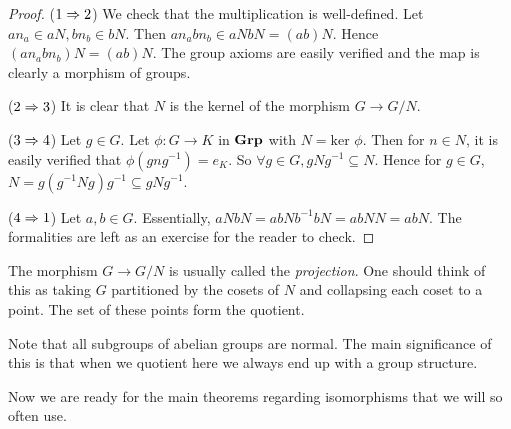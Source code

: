 \documentclass[../book.tex]{subfiles}
\begin{document}
\begin{proof}
    ($1 \Rightarrow 2$) 
        We check that the multiplication is well-defined. 
        Let $an_a \in aN, bn_b \in bN$. 
        Then $an_abn_b \in aNbN = (ab)N$. 
        Hence $(an_abn_b)N = (ab)N$.
        The group axioms are easily verified
        and the map is clearly a morphism of groups.
        
    ($2 \Rightarrow 3$)
        It is clear that $N$ is the kernel of the morphism
        $G \to G/N$.
        
    ($3 \Rightarrow 4$)
        Let $g \in G$. 
        Let $\phi : G \to K$ in $\mathbf{Grp}$ with $N = \text{ker }\phi$.
        Then for $n \in N$, it is easily verified that $\phi(gng^{-1}) = e_K$. 
        So $\forall g \in G, gNg^{-1} \subseteq N$. 
        Hence for $g \in G$, $N = g(g^{-1}Ng)g^{-1} \subseteq gNg^{-1}$.
        
    ($4 \Rightarrow 1$)
        Let $a, b \in G$. 
        Essentially, $aNbN = abNb^{-1}bN = abNN = abN$. 
        The formalities are left as an exercise for the reader to check. 
        
\end{proof}

\begin{rmk}
    The morphism $G \to G/N$ is usually called the \emph{projection}. 
    One should think of this as taking $G$ partitioned by the cosets of $N$
    and collapsing each coset to a point. 
    The set of these points form the quotient. 
\end{rmk}

\begin{rmk}
    Note that all subgroups of abelian groups are normal. 
    The main significance of this is that 
    when we quotient here we always end up with a group structure.
\end{rmk}

Now we are ready for the main theorems regarding isomorphisms
that we will so often use. 
\end{document}
